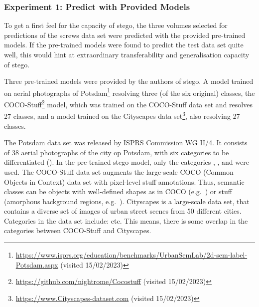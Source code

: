 
\subsubsection{Experiment 1: Predict with Provided Models}
To get a first feel for the capacity of \gls{stego}, the three volumes selected for predictions of the screws data set were predicted with the provided pre-trained models.
If the pre-trained models were found to predict the test data set quite well, this would hint at extraordinary transferability and generalisation capacity of \gls{stego}.


Three pre-trained models were provided by the authors of \gls{stego}.
A model trained on aerial photographs of Potsdam\footnote{\url{https://www.isprs.org/education/benchmarks/UrbanSemLab/2d-sem-label-Potsdam.aspx} (visited 15/02/2023)} resolving three (of the six original) classes, the COCO-Stuff\footnote{\url{https://github.com/nightrome/Cocostuff} (visited 15/02/2023)} model, which was trained on the COCO-Stuff data set and resolves 27 classes, and a model trained on the Cityscapes data set\footnote{\url{https://www.Cityscapes-dataset.com} (visited 15/02/2023)}, also resolving 27 classes.~\autocite{Hamilton2022}

The Potsdam data set was released by ISPRS Commission WG II/4.
It consists of 38 aerial photographs of the city op Potsdam, with six categories to be differentiated ().
In the pre-trained \gls{stego} model, only the categories , , and  were used.
The COCO-Stuff data set augments the large-scale COCO (Common Objects in Context) data set with pixel-level stuff annotations.
Thus, semantic classes can be objects with well-defined shapes as in COCO (e.g.~) or stuff (amorphous background regions, e.g.~).
Cityscapes is a large-scale data set, that contains a diverse set of images of urban street scenes from 50 different cities.
Categories in the data set include:  etc.
This means, there is some overlap in the categories between COCO-Stuff and Cityscapes.~\autocite{Hamilton2022}


